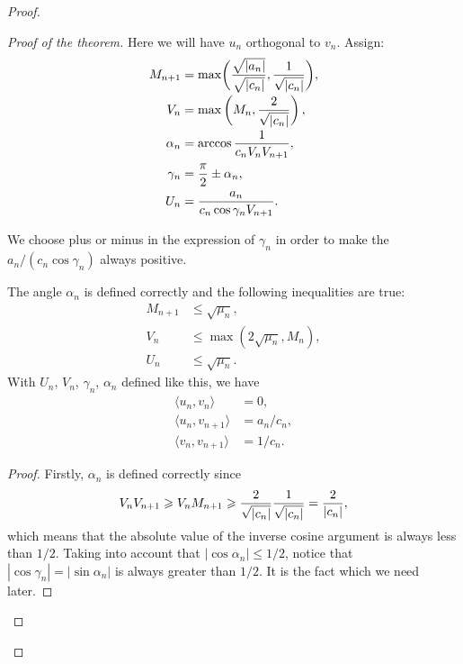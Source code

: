 \begin{proof}
\begin{proof}[Proof of the theorem]
          Here we will have $u_n$ orthogonal to $v_n$.
          Assign:
          \begin{align*}
            M_{n+1} &= \max\biggl(\smash[b]{\frac{\sqrt{|a_n|}}{\sqrt{|c_n|}}}, \frac{1}{\sqrt{\smash[b]{|c_n|}}}\biggr),\\
            V_n &= \max\left(M_n, \frac{2}{\sqrt{\smash[b]{|c_n|}}}\right),\\
            \alpha_n &= \arccos{\frac{1}{c_n V_n V_{n+1}}},\\
            \gamma_n &= \frac{\pi}{2} \pm \alpha_n,\\
            U_n &= \frac{a_n}{c_n \cos{\gamma_n} V_{n+1}}.
          \end{align*}
          \begin{remark*}
            We choose plus or minus in the expression of $\gamma_n$ in order to make the $a_n/(c_n \cos{\gamma_n})$ always positive.
          \end{remark*}
          \begin{prop}
            The angle $\alpha_n$ is defined correctly and the following inequalities are true:
            \begin{align*}
                M_{n+1} &\leq \sqrt{\mu_n},\\
                V_n &\leq \max(2\sqrt{\mu_n}, M_n),\\
                U_n &\leq \sqrt{\mu_n}.
            \end{align*}
            With $U_n$, $V_n$, $\gamma_n$, $\alpha_n$ defined like this, we have
            \begin{equation}
              \label{eqn:case2}
              \begin{aligned}
                \langle u_n, v_n \rangle &= 0,\\
                \langle u_n, v_{n+1} \rangle &= a_n/c_n,\\
                \langle v_n, v_{n+1} \rangle &= 1/c_n.
              \end{aligned}
            \end{equation}
          \end{prop}
          \begin{proof}
            Firstly, $\alpha_n$ is defined correctly since
            \[
              V_n V_{n+1} \geq V_n M_{n+1} \geq \frac{2}{\sqrt{\smash[b]{|c_n|}}} \frac{1}{\sqrt{\smash[b]{|c_n|}}} = \frac{2}{|c_n|},
            \]
              which means that the absolute value of the inverse cosine argument is always less than $1/2$.
            Taking into account that $|\cos{\alpha_n}| \leq 1/2$, notice that $|\cos{\gamma_n}| = |\sin{\alpha_n}|$ is always greater than $1/2$.
            It is the fact which we need later.


\end{proof}
\end{proof}
\end{proof}
